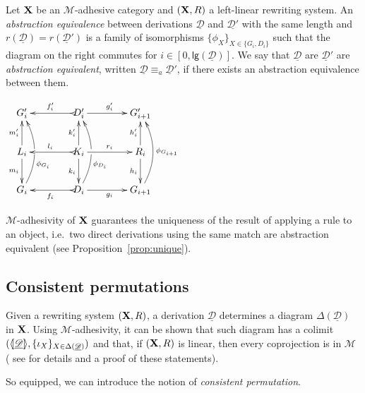 \documentclass[a4paper,UKenglish,cleveref,pdftex,thm-restate,numberwithinsect]{lipics-v2021}
\def\R{\mathsf{R}}
\def\X{\textbf {\textup{X}}}
\def\G{\textbf {\textup{G}}}
\newcommand{\dder}[1]{\mathscr{#1}}
\newcommand{\der}[1]{\underline{\dder{#1}}}
\newcommand{\lpro}{\langle \hspace{-1.85pt}[}
\newcommand{\rpro}{]\hspace{-1.85pt}\rangle}
\newcommand{\tpro}[1]{\lpro \der{#1}\rpro}
\newcommand{\lgh}[0]{\mathsf{lg}}
\begin{document}
\noindent
\parbox{8cm}{
  \begin{definition}
    Let  $\X$ be an $\mathcal{M}$-adhesive category and 
    $(\X, \R)$ a left-linear rewriting system. 
    An \emph{abstraction equivalence} between derivations $\der{D}$
    and $\der{D'}$ with the same length and
    $r(\der{D})=r(\der{D}')$ is a family of isomorphisms
    $\{\phi_X\}_{X\in \{G_i,D_i\}}$ such that the diagram on the right commutes
    for $i\in [0, \lgh(\der{D})]$. We say that $\der{D}$ are $\der{D}'$ are \emph{abstraction
      equivalent}, written $\der{D}\equiv_a \der{D}'$, if there exists an abstraction equivalence between
    them.
  \end{definition}
}
\parbox{4cm}{\vspace{-1.35em}$\xymatrix@C=40pt{G'_i&D'_i \ar[r]^{g'_i}
    \ar@{>->}[l]_{f'_i}&G'_{i+1}\\ L_i \ar[u]^{m'_i} \ar[d]_{m_i}& K_i
    \ar[u]^{k'_i} \ar[d]_{k_i} \ar[r]^{r_i} \ar@{>->}[l]_{l_i}
    &R_i \ar[u]^{h'_i} \ar[d]_{h_i}\\G_i
    \ar@/_.45cm/[uu]_(.35){\phi_{G_i}}|\hole&D_i\ar@{>->}[l]^{f_i}\ar@/_.45cm/[uu]_(.35){\phi_{D_i}}|\hole
    \ar[r]_{g_i}&G_{i+1}\ar@/_.45cm/[uu]_{\phi_{G_{i+1}}}}$}


$\mathcal{M}$-adhesivity of $\X$ guarantees the
uniqueness of the result of applying a rule to an object, i.e.~two
direct derivations using the same match are abstraction equivalent
(see Proposition~\ref{prop:unique}).


\iffalse
\subsection{Consistent permutations}

Given a rewriting system $(\X, \R)$,  a derivation $\der{D}$ determines a diagram
$\Delta(\der{D})$ in $\X$. Using $\mathcal{M}$-adhesivity, it can be shown  that such diagram has a colimit $(\tpro{D}, \{\iota_X\}_{X\in \Delta(\der{D})})$ and that, if $(\X, \R)$ is linear, then every coprojection is in $\mathcal{M}$ ( see  for details and a proof of these statements).


So equipped, we can introduce the notion of \emph{consistent permutation}.
\end{document}

